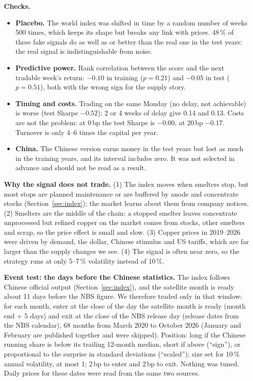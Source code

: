 \documentclass[10pt,a4paper]{article}
\begin{document}
\textbf{Checks.}
\begin{itemize}[leftmargin=1.2em]
  \item \textbf{Placebo.} The world index was shifted in time by a random number of weeks 500 times, which keeps its shape but breaks any link with prices. 48\,\% of these fake signals do as well as or better than the real one in the test years: the real signal is indistinguishable from noise.
  \item \textbf{Predictive power.} Rank correlation between the score and the next tradable week's return: $-0.10$ in training ($p=0.21$) and $-0.05$ in test ($p=0.51$), both with the wrong sign for the supply story.
  \item \textbf{Timing and costs.} Trading on the same Monday (no delay, not achievable) is worse (test Sharpe $-0.52$); 2 or 4 weeks of delay give 0.14 and 0.13. Costs are not the problem: at 0\,bp the test Sharpe is $-0.00$, at 20\,bp $-0.17$. Turnover is only 4--6 times the capital per year.
  \item \textbf{China.} The Chinese version earns money in the test years but lost as much in the training years, and its interval includes zero. It was not selected in advance and should not be read as a result.
\end{itemize}

\textbf{Why the signal does not trade.} (1) The index moves when smelters stop, but most stops are planned maintenance or are buffered by anode and concentrate stocks (Section~\ref{sec:index}); the market learns about them from company notices. (2) Smelters are the middle of the chain: a stopped smelter leaves concentrate unprocessed but refined copper on the market comes from stocks, other smelters and scrap, so the price effect is small and slow. (3) Copper prices in 2019--2026 were driven by demand, the dollar, Chinese stimulus and US tariffs, which are far larger than the supply changes we see. (4) The signal is often near zero, so the strategy runs at only 5--7\,\% volatility instead of 10\,\%.

\textbf{Event test: the days before the Chinese statistics.} The index follows Chinese official output (Section~\ref{sec:index}), and the satellite month is ready about 11 days before the NBS figure. We therefore traded only in that window: for each month, enter at the close of the day the satellite month is ready (month end + 5 days) and exit at the close of the NBS release day (release dates from the NBS calendar), 68 months from March 2020 to October 2026 (January and February are published together and were skipped). Position: long if the Chinese running share is below its trailing 12-month median, short if above (``sign''), or proportional to the surprise in standard deviations (``scaled''); size set for 10\,\% annual volatility, at most 1; 2\,bp to enter and 2\,bp to exit. Nothing was tuned. Daily prices for these dates were read from the same two sources.
\end{document}
